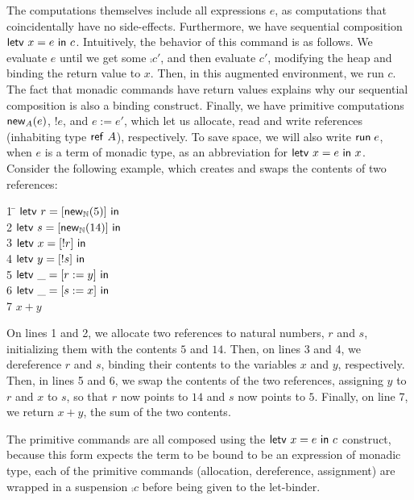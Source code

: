 \documentclass[preprint,natbib]{sigplanconf}
\begin{document}
The computations themselves include all expressions $e$, as
computations that coincidentally have no side-effects. Furthermore, we
have sequential composition $\mbox{\textsf{{letv }}}x = e\mbox{\textsf{{ in }}}c$. Intuitively, the
behavior of this command is as follows. We evaluate $e$ until we get
some $\comp{c'}$, and then evaluate $c'$, modifying the heap and
binding the return value to $x$. Then, in this augmented environment,
we run $c$. The fact that monadic commands have return values explains
why our sequential composition is also a binding construct. Finally,
we have primitive computations $\mbox{\textsf{{new}}}_{A}(e)$, $!e$, and $e := e'$,
which let us allocate, read and write references (inhabiting type
$\mbox{\textsf{{ref }}}A$), respectively. To save space, we will also write
$\mbox{\textsf{{run}}}\;e$, when $e$ is a term of monadic type, as an
abbreviation for $\mbox{\textsf{{letv }}}x = e\mbox{\textsf{{ in }}}x$. Consider the following example,
which creates and swaps the contents of two references:
\begin{tabbing}
1 \qquad \= $\mbox{\textsf{{letv }}}r = [\mbox{\textsf{{new}}}_{\mathbb{N}}(5)]\mbox{\textsf{{ in }}}$ \\
2 \> $\mbox{\textsf{{letv }}}s = [\mbox{\textsf{{new}}}_{\mathbb{N}}(14)]\mbox{\textsf{{ in }}}$ \\
3 \> $\mbox{\textsf{{letv }}}x = [!r]\mbox{\textsf{{ in }}}$ \\
4 \> $\mbox{\textsf{{letv }}}y = [!s]\mbox{\textsf{{ in }}}$ \\
5 \> $\mbox{\textsf{{letv }}}\_ = [r := y]\mbox{\textsf{{ in }}}$ \\
6 \> $\mbox{\textsf{{letv }}}\_ = [s := x]\mbox{\textsf{{ in }}}$ \\
7 \> $x + y$ \\
\end{tabbing}
On lines 1 and 2, we allocate two references to natural numbers, $r$
and $s$, initializing them with the contents $5$ and $14$. Then, on
lines 3 and 4, we dereference $r$ and $s$, binding their contents to
the variables $x$ and $y$, respectively. Then, in lines 5 and 6, we
swap the contents of the two references, assigning $y$ to $r$ and $x$
to $s$, so that $r$ now points to $14$ and $s$ now points to $5$. 
Finally, on line 7, we return $x+y$, the sum of the two contents.

The primitive commands are all composed using the $\mbox{\textsf{{letv }}}x = e\mbox{\textsf{{ in }}}c$
construct, because this form expects the term to be bound to be an
expression of monadic type, each of the primitive commands
(allocation, dereference, assignment) are wrapped in a suspension
$\comp{c}$ before being given to the let-binder. 
\end{document}
